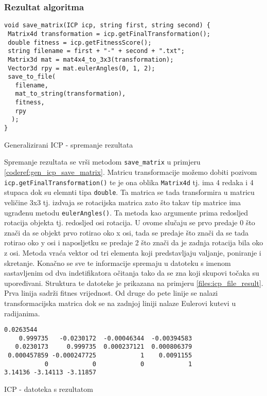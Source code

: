 \subsubsection{Rezultat algoritma}

\begin{listing}[H]
  \begin{verbatim}
void save_matrix(ICP icp, string first, string second) {
 Matrix4d transformation = icp.getFinalTransformation();
 double fitness = icp.getFitnessScore();
 string filename = first + "-" + second + ".txt";
 Matrix3d mat = mat4x4_to_3x3(transformation);
 Vector3d rpy = mat.eulerAngles(0, 1, 2);
 save_to_file(
   filename,
   mat_to_string(transformation),
   fitness,
   rpy
  );
}
  \end{verbatim}
  \caption{Generalizirani ICP - spremanje rezultata}
  \label{coderef:gen_icp_save_matrix}
\end{listing}

Spremanje rezultata se vrši metodom \texttt{save_matrix} u primjeru \ref{coderef:gen_icp_save_matrix}. Matricu transformacije možemo dobiti pozivom \texttt{icp.getFinalTransformation()} te je ona oblika \texttt{Matrix4d} tj. ima 4 redaka i 4 stupaca dok su elemnti tipa \texttt{double}. Ta matrica se tada transformira u matricu veličine 3x3 tj. izdvaja se rotacijska matrica zato što takav tip matrice ima ugrađenu metodu \texttt{eulerAngles()}. Ta metoda kao argumente prima redosljed rotacija objekta tj. redosljed osi rotacija. U ovome slučaju se prvo predaje 0 što znači da se objekt prvo rotirao oko x osi, tada se predaje što znači da se tada rotirao oko y osi i naposljetku se predaje 2 što znači da je zadnja rotacija bila oko z osi. Metoda vraća vektor od tri elementa koji predstavljaju valjanje, poniranje i skretanje. Konačno se sve te informacije spremaju u datoteku s imenom sastavljenim od dva indetifikatora očitanja tako da se zna koji skupovi točaka su upoređivani. Struktura te datoteke je prikazana na primjeru  \ref{files:icp_file_result}. Prva linija sadrži fitnes vrijednost. Od druge do pete linije se nalazi transformacijska matrica dok se na zadnjoj liniji nalaze Eulerovi kutevi u radijanima.
\begin{listing}[H]
  \begin{verbatim}
0.0263544
    0.999735   -0.0230172  -0.00046344  -0.00394583
   0.0230173     0.999735  0.000237121  0.000806379
 0.000457859 -0.000247725            1    0.0091155
           0            0            0            1
3.14136 -3.14113 -3.11857
  \end{verbatim}
  \caption{ICP - datoteka s rezultatom}
  \label{files:icp_file_result}
\end{listing}

